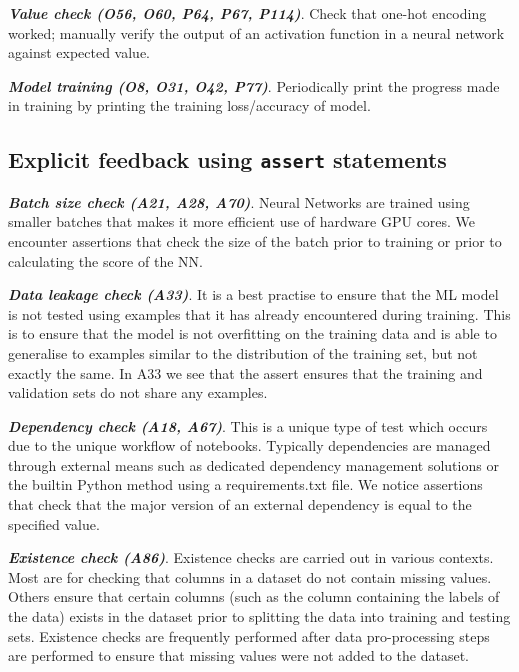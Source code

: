 \documentclass[sigconf]{acmart}
\begin{document}
\textbf{\emph{Value check (O56, O60, P64, P67, P114)}}. Check that one-hot encoding worked; manually verify the output of an activation function in a neural network against expected value.

\textbf{\emph{Model training (O8, O31, O42, P77)}}. Periodically print the progress made in training by printing the training loss/accuracy of model.

\subsection{Explicit feedback using \texttt{assert} statements}

\textbf{\emph{Batch size check (A21, A28, A70)}}. Neural Networks are trained using smaller batches that makes it more efficient use of hardware GPU cores. We encounter assertions that check the size of the batch prior to training or prior to calculating the score of the NN.

\textbf{\emph{Data leakage check (A33)}}. It is a best practise to ensure that the ML model is not tested using examples that it has already encountered during training. This is to ensure that the model is not overfitting on the training data and is able to generalise to examples similar to the distribution of the training set, but not exactly the same. In A33 we see that the assert ensures that the training and validation sets do not share any examples.

\textbf{\emph{Dependency check (A18, A67)}}. This is a unique type of test which occurs due to the unique workflow of notebooks. Typically dependencies are managed through external means such as dedicated dependency management solutions or the builtin Python method using a requirements.txt file. We notice assertions that check that the major version of an external dependency is equal to the specified value.


\textbf{\emph{Existence check (A86)}}. Existence checks are carried out in various contexts. Most are for checking that columns in a dataset do not contain missing values. Others ensure that certain columns (such as the column containing the labels of the data) exists in the dataset prior to splitting the data into training and testing sets. Existence checks are frequently performed after data pro-processing  steps are performed to ensure that missing values were not added to the dataset.
\end{document}
